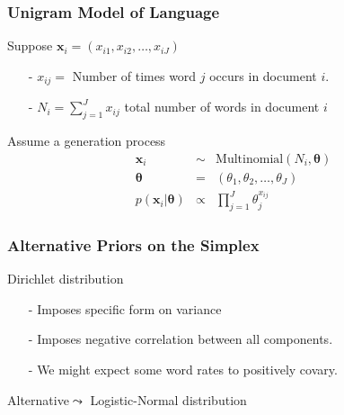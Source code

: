 \documentclass{beamer}
\numberwithin{equation}{section}
\begin{document}
\begin{frame}
\frametitle{Unigram Model of Language}

Suppose $\boldsymbol{x}_{i} = (x_{i1}, x_{i2}, \hdots, x_{iJ})$ \\
\begin{itemize}
\item[-] $x_{ij} = $ Number of times word $j$ occurs in document $i$.  
\item[-] $N_{i} = \sum_{j=1}^{J} x_{ij}$ total number of words in document $i$
\end{itemize}

Assume a generation process
\begin{eqnarray}
\boldsymbol{x}_{i} & \sim & \text{Multinomial}(N_{i}, \boldsymbol{\theta}) \nonumber \\
\boldsymbol{\theta} & = & (\theta_{1}, \theta_{2}, \hdots, \theta_{J}) \nonumber \\
p(\boldsymbol{x}_{i}| \boldsymbol{\theta}) & \propto & \prod_{j=1}^{J} \theta_{j}^{x_{ij}} \nonumber 
\end{eqnarray}





\end{frame}




\begin{frame}
\frametitle{Alternative Priors on the Simplex}

Dirichlet distribution
\begin{itemize}
\item[-] Imposes specific form on variance
\item[-] Imposes negative correlation between all components.
\item[-] We might expect some word rates to positively covary. \end{itemize}

Alternative$\leadsto$ \alert{Logistic-Normal} distribution


\end{frame}
\end{document}
